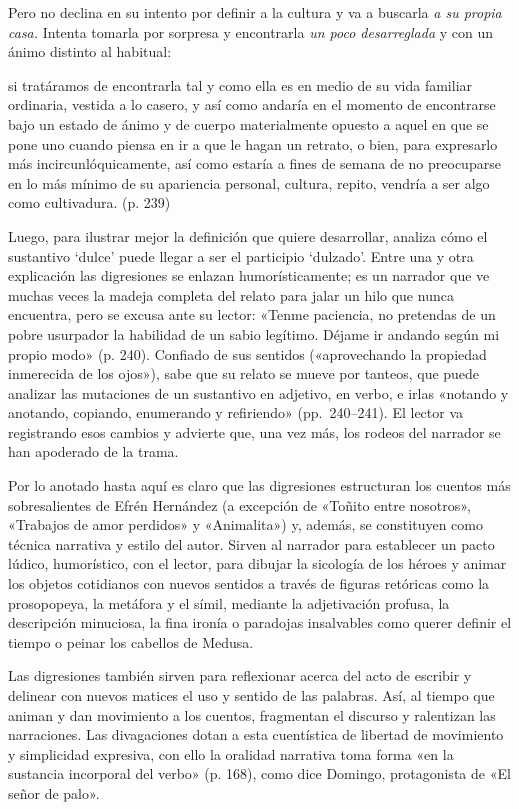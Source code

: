 \documentclass[14pt,twoside,final]{extbook} %
\begin{document}
Pero no declina en su intento por definir a la cultura y va a buscarla \emph{a su propia casa.} Intenta tomarla por sorpresa y encontrarla \emph{un poco desarreglada} y con un ánimo distinto al habitual:\protect\enlargethispage*{\baselineskip}
\begin{quoting}
si tratáramos de encontrarla tal y como ella es en medio de su vida familiar ordinaria, vestida a lo casero, y así como andaría en el momento de encontrarse bajo un estado de ánimo y de cuerpo materialmente opuesto a aquel en que se pone uno cuando piensa en ir a que le hagan un retrato, o bien, para expresarlo más incircunlóquicamente, así como estaría a fines de semana de no preocuparse en lo más mínimo de su apariencia personal, cultura, repito, vendría a ser algo como cultivadura. (p. 239)
\end{quoting}
Luego, para ilustrar mejor la definición que quiere desarrollar, analiza cómo el sustantivo `dulce' puede llegar a ser el participio `dulzado'. Entre una y otra explicación las digresiones se enlazan
humorísticamente; es un narrador que ve muchas veces la madeja completa del relato para jalar un hilo que nunca encuentra, pero se excusa ante su lector: «Tenme paciencia, no pretendas de un pobre usurpador la habilidad de un sabio legítimo. Déjame ir andando según mi propio modo» (p. 240). Confiado de sus sentidos («aprovechando la propiedad inmerecida de los ojos»), sabe que su relato se mueve por tanteos, que puede analizar las mutaciones de un sustantivo en adjetivo, en verbo, e irlas «notando y anotando, copiando, enumerando y refiriendo» (pp.~240--241). El lector va registrando esos cambios y advierte que, una vez más, los rodeos del narrador se han apoderado de la trama.

Por lo anotado hasta aquí es claro que las digresiones estructuran los cuentos más sobresalientes de Efrén Hernández (a excepción de «Toñito entre nosotros», «Trabajos de amor perdidos» y «Animalita») y, además, se constituyen como técnica narrativa y estilo del autor. Sirven al narrador para establecer un pacto lúdico, humorístico, con el lector, para dibujar la sicología de los héroes y animar los objetos cotidianos con nuevos sentidos a través de figuras retóricas como la prosopopeya, la metáfora y el símil, mediante la adjetivación profusa, la descripción minuciosa, la fina ironía o paradojas insalvables como querer definir el tiempo o peinar los cabellos de Medusa.

Las digresiones también sirven para reflexionar acerca del acto de escribir y delinear con nuevos matices el uso y sentido de las palabras. Así, al tiempo que animan y dan movimiento a los cuentos, fragmentan el discurso y ralentizan las narraciones. Las divagaciones dotan a esta cuentística de libertad de movimiento y simplicidad expresiva, con ello la oralidad narrativa toma forma «en la sustancia incorporal del verbo» (p. 168), como dice Domingo, protagonista de «El señor de palo».
\end{document}
